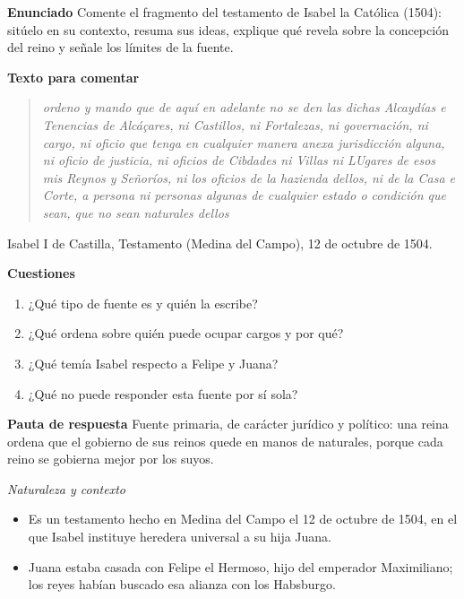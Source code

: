 \documentclass{book}
\begin{document}
\begin{tcolorbox}[title={Ejercicio resuelto}, studiumworked, breakable]

\noindent\textbf{Enunciado}
Comente el fragmento del testamento de Isabel la Católica (1504): sitúelo en su contexto, resuma sus ideas, explique qué revela sobre la concepción del reino y señale los límites de la fuente.


\noindent\textbf{Texto para comentar}

\begin{quote}
\itshape ordeno y mando que de aquí en adelante no se den las dichas Alcaydías e Tenencias de Alcáçares, ni Castillos, ni Fortalezas, ni governación, ni cargo, ni oficio que tenga en cualquier manera anexa jurisdicción alguna, ni oficio de justicia, ni oficios de Cibdades ni Villas ni LUgares de esos mis Reynos y Señoríos, ni los oficios de la hazienda dellos, ni de la Casa e Corte, a persona ni personas algunas de cualquier estado o condición que sean, que no sean naturales dellos
\end{quote}
{\noindent\footnotesize Isabel I de Castilla, Testamento (Medina del Campo), 12 de octubre de 1504.\par}

\noindent\textbf{Cuestiones}
\begin{enumerate}
\item ¿Qué tipo de fuente es y quién la escribe?
\item ¿Qué ordena sobre quién puede ocupar cargos y por qué?
\item ¿Qué temía Isabel respecto a Felipe y Juana?
\item ¿Qué no puede responder esta fuente por sí sola?
\end{enumerate}

\noindent\textbf{Pauta de respuesta}
Fuente primaria, de carácter jurídico y político: una reina ordena que el gobierno de sus reinos quede en manos de naturales, porque cada reino se gobierna mejor por los suyos.


\noindent\textit{Naturaleza y contexto}
\begin{itemize}
\item Es un testamento hecho en Medina del Campo el 12 de octubre de 1504, en el que Isabel instituye heredera universal a su hija Juana.
\item Juana estaba casada con Felipe el Hermoso, hijo del emperador Maximiliano; los reyes habían buscado esa alianza con los Habsburgo.
\end{itemize}


\end{tcolorbox}
\end{document}
